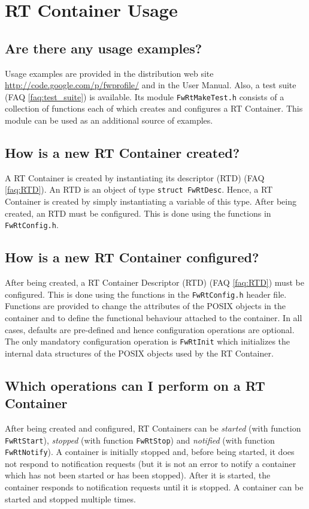 \documentclass[faq]{../fwprofile}
\begin{document}
\section{RT Container Usage}

\subsection{Are there any usage examples?}
Usage examples are provided in the distribution web site 
\url{http://code.google.com/p/fwprofile/} and in the User Manual. Also, a test suite (FAQ \ref{faq:test_suite}) is available. Its module \texttt{FwRtMakeTest.h} consists of a collection of functions each 
of which creates and configures a RT Container. This module can be used as an additional source of examples.

\subsection{How is a new RT Container created?}
A RT Container is created by instantiating its descriptor (RTD) (FAQ \ref{faq:RTD}). An RTD is an object of type \texttt{struct FwRtDesc}. Hence, a RT Container is created by simply instantiating a variable of this type. After being created, an RTD must be configured. This is done using the functions in \texttt{FwRtConfig.h}. 

\subsection{How is a new RT Container configured?}
After being created, a RT Container Descriptor (RTD) (FAQ \ref{faq:RTD}) must be configured. This is done using the functions in the \texttt{FwRtConfig.h} header file. Functions are provided to change the attributes of the POSIX objects in the container and to define the functional behaviour attached to the container. In all cases, defaults are pre-defined and hence configuration operations are optional. The only mandatory configuration operation is \texttt{FwRtInit} which initializes the internal data structures of the POSIX objects used by the RT Container.

\subsection{Which operations can I perform on a RT Container}
After being created and configured, RT Containers can be \emph{started} (with function \texttt{FwRtStart}), \emph{stopped} (with function 
\texttt{FwRtStop}) and \emph{notified} (with function \texttt{FwRtNotify}). A container is initially stopped and, before being started, 
it does not respond to notification requests (but it is not an error to notify a container which has not been started or has been stopped). 
After it is started, the container responds to notification requests until it is stopped. A container can be started and stopped multiple times.
\end{document}

